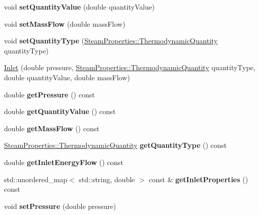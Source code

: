 \begin{DoxyCompactItemize}
void {\bfseries set\+Quantity\+Value} (double quantity\+Value)
\item 
\mbox{\label{class_inlet_a1e427ac34eeebf46546ed53499359459}} 
void {\bfseries set\+Mass\+Flow} (double mass\+Flow)
\item 
\mbox{\label{class_inlet_a4171632101de3f4c97c93bb06c6b51e4}} 
void {\bfseries set\+Quantity\+Type} (\hyperlink{class_steam_properties_ae0294bedf7d178c2d8fb6aed0f62fbff}{Steam\+Properties\+::\+Thermodynamic\+Quantity} quantity\+Type)
\item 
\hyperlink{class_inlet_a1b0e1d27b8c7b11cfd96623b1c0b8a9e}{Inlet} (double pressure, \hyperlink{class_steam_properties_ae0294bedf7d178c2d8fb6aed0f62fbff}{Steam\+Properties\+::\+Thermodynamic\+Quantity} quantity\+Type, double quantity\+Value, double mass\+Flow)
\item 
\mbox{\label{class_inlet_af9bc455eb1287892901b7d090dabddfd}} 
double {\bfseries get\+Pressure} () const
\item 
\mbox{\label{class_inlet_ac9279e9c81b989b795351f09c4dd2b71}} 
double {\bfseries get\+Quantity\+Value} () const
\item 
\mbox{\label{class_inlet_af32941228d08175cb13d6f7757de39aa}} 
double {\bfseries get\+Mass\+Flow} () const
\item 
\mbox{\label{class_inlet_a3ed1699b174d0698af937c7146bbee79}} 
\hyperlink{class_steam_properties_ae0294bedf7d178c2d8fb6aed0f62fbff}{Steam\+Properties\+::\+Thermodynamic\+Quantity} {\bfseries get\+Quantity\+Type} () const
\item 
\mbox{\label{class_inlet_a870b939e6b0de093a42341e3fa22d75b}} 
double {\bfseries get\+Inlet\+Energy\+Flow} () const
\item 
\mbox{\label{class_inlet_a3c80c1f4bd8ef59b557c789f4b86960f}} 
std\+::unordered\+\_\+map$<$ std\+::string, double $>$ const  \& {\bfseries get\+Inlet\+Properties} () const
\item 
\mbox{\label{class_inlet_ad0d848976347160293c6576e005f090b}} 
void {\bfseries set\+Pressure} (double pressure)

\end{DoxyCompactItemize}
